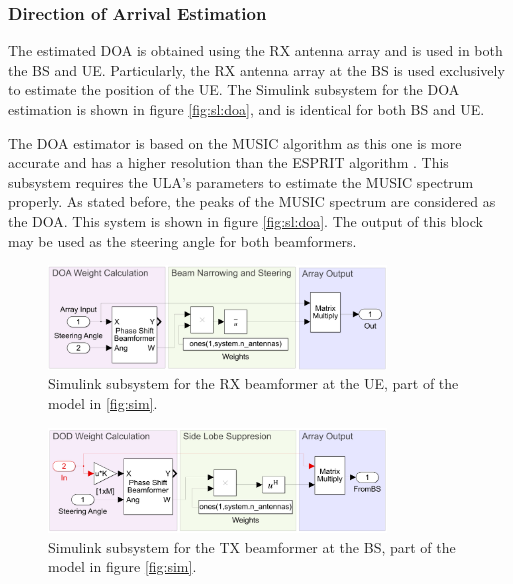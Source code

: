 \documentclass[12pt,a4paper]{report}
\begin{document}
\subsubsection{Direction of Arrival Estimation}
The estimated DOA is obtained using the RX antenna array and is used in both the BS and UE. Particularly, the RX antenna array at the BS is used exclusively to estimate the position of the UE. The Simulink subsystem for the DOA estimation is shown in figure \ref{fig:sl:doa}, and is identical for both BS and UE.

The DOA estimator is based on the MUSIC algorithm as this one is more accurate and has a higher resolution than the ESPRIT algorithm \cite{Oumar2012}. This subsystem requires the ULA's parameters to estimate the MUSIC spectrum properly. As stated before, the peaks of the MUSIC spectrum are considered as the DOA. This system is shown in figure \ref{fig:sl:doa}. The output of this block may be used as the steering angle for both beamformers.

\begin{figure}[h]
    \centering
    \includegraphics[width = 0.8\textwidth]{Figures/SL_RX_BF.png}
    \caption[Simulink subsystem for the RX beamformer at the UE.]
    {Simulink subsystem for the RX beamformer at the UE, part of the model in \ref{fig:sim}.}
    \label{fig:sl:rx_bf}
\end{figure}

\begin{figure}[h]
    \centering
    \includegraphics[width = 0.8\textwidth]{Figures/SL_TX_BF.png}
    \caption[Simulink subsystem for the TX beamformer at the BS.]
    {Simulink subsystem for the TX beamformer at the BS, part of the model in figure \ref{fig:sim}.}
    \label{fig:sl:tx_bf}
\end{figure}
\end{document}
